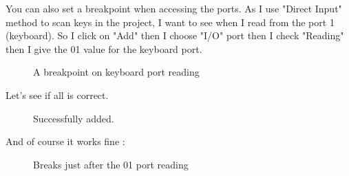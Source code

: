 \documentclass[10pt]{report}
\begin{document}
You can also set a breakpoint when accessing the ports.\newline
As I use "Direct Input" method to scan keys in the project, I want to see when I read from the port 1 (keyboard).\newline
So I click on "Add" then I choose "I/O" port then I check "Reading" then I give the 01 value for the keyboard port.\newline
\begin{figure}[H]
\centering
{}
\caption{A breakpoint on keyboard port reading}
\end{figure}

Let's see if all is correct.\newline
\begin{figure}[H]
\centering
{}
\caption{Successfully added.}
\end{figure}

And of course it works fine :\newline
\begin{figure}[H]
\centering
{}
\caption{Breaks just after the 01 port reading}
\end{figure}
\end{document}
